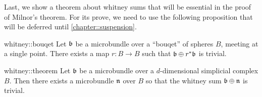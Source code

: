 \begin{myparagraph}
    Last, we show a theorem about whitney sums that will be essential in the proof of Milnor's theorem.
    For its prove, we need to use the following proposition that will be deferred until \autoref{chapter::suspension}.
\end{myparagraph}

\begin{myproposition}{whitney::bouqet}
    Let $\mathfrak{b}$ be a microbundle over a ``bouqet'' of spheres $B$, meeting at a single point.
    There exists a map $r: B \to B$ such that $\mathfrak{b} \oplus r^*\mathfrak{b}$ is trivial.
\end{myproposition}

\begin{mytheorem}{whitney::theorem}
    Let $\mathfrak{b}$ be a microbundle over a $d$-dimensional simplicial complex $B$.
    Then there exists a microbundle $\mathfrak{n}$ over $B$ so that the whitney sum $\mathfrak{b} \oplus \mathfrak{n}$ is trivial.
\end{mytheorem}

